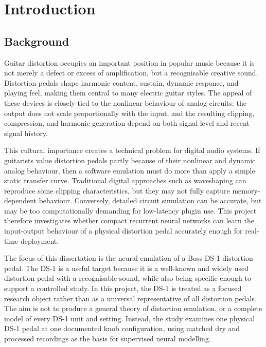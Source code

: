 \chapter{Introduction}
\label{chap:introduction}

\section{Background}
\label{sec:introduction-background}

Guitar distortion occupies an important position in popular music because it is not merely a defect or excess of amplification, but a recognisable creative sound. Distortion pedals shape harmonic content, sustain, dynamic response, and playing feel, making them central to many electric guitar styles. The appeal of these devices is closely tied to the nonlinear behaviour of analog circuits: the output does not scale proportionally with the input, and the resulting clipping, compression, and harmonic generation depend on both signal level and recent signal history.

This cultural importance creates a technical problem for digital audio systems. If guitarists value distortion pedals partly because of their nonlinear and dynamic analog behaviour, then a software emulation must do more than apply a simple static transfer curve. Traditional digital approaches such as waveshaping can reproduce some clipping characteristics, but they may not fully capture memory-dependent behaviour. Conversely, detailed circuit simulation can be accurate, but may be too computationally demanding for low-latency plugin use. This project therefore investigates whether compact recurrent neural networks can learn the input-output behaviour of a physical distortion pedal accurately enough for real-time deployment.

The focus of this dissertation is the neural emulation of a Boss DS-1 distortion pedal. The DS-1 is a useful target because it is a well-known and widely used distortion pedal with a recognisable sound, while also being specific enough to support a controlled study. In this project, the DS-1 is treated as a focused research object rather than as a universal representative of all distortion pedals. The aim is not to produce a general theory of distortion emulation, or a complete model of every DS-1 unit and setting. Instead, the study examines one physical DS-1 pedal at one documented knob configuration, using matched dry and processed recordings as the basis for supervised neural modelling.

